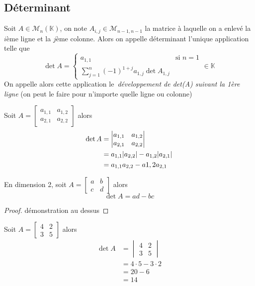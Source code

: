 \documentclass[11pt,colorlinks]{book}
\theoremstyle{mytheoremstyle}
\theoremstyle{mytheoremstyle}
\theoremstyle{mytheoremstyle}
\theoremstyle{mytheoremstyle}
\theoremstyle{mytheoremstyle}
\theoremstyle{mytheoremstyle}
\theoremstyle{mytheoremstyle}
\theoremstyle{mytheoremstyle}
\theoremstyle{myproblemstyle}
\def\mbb#1{\mathbb{#1}}
\def\bK{\mbb{K}}
\begin{document}
\subsection{Déterminant}
\begin{definition}
  Soit $A \in \mathcal{M}_n(\bK)$, on note $A_{i,j} \in \mathcal{M}_{n-1,n-1}$ la matrice à laquelle on a enlevé la $i$ème ligne et la 
  $j$ème colonne. Alors on appelle déterminant l'unique application telle que 
  \begin{equation*}
    \det A = \begin{cases}
      a_{1,1} &\text{si } n=1 \\ 
      \sum_{j=1}^{n} (-1)^{1+j} a_{1,j} \det A_{1,j}
    \end{cases} \in \bK
  \end{equation*}
  On appelle alors cette application le \textit{développement de det(A) suivant la 1ère ligne} (on peut le faire pour n'importe quelle ligne ou colonne)
\end{definition}
\begin{ex}
  Soit $A = \begin{bmatrix}
    a_{1,1} & a_{1,2} \\ 
    a_{2,1} & a_{2,2} 
  \end{bmatrix}$
  alors 
  \begin{align*}
    \det A &= \begin{vmatrix}
      a_{1,1} & a_{1,2} \\ 
      a_{2,1} & a_{2,2} 
    \end{vmatrix} \\ 
    &= a_{1,1} \abs{a_{2,2}} - a_{1,2} \abs{a_{2,1}} \\ 
    &= a_{1,1}a_{2,2} - a{1,2}a_{2,1}
  \end{align*}
\end{ex}
\begin{theorem}
  En dimension 2, soit $A = \begin{bmatrix}
    a & b \\ 
    c & d
  \end{bmatrix}$ 
  alors 
  \begin{equation*}
    \det A = ad - bc 
  \end{equation*}
  \begin{proof}
    démonstration au dessus
  \end{proof}
\end{theorem}
\begin{ex}
  Soit $A = \begin{bmatrix}
    4 & 2 \\ 
    3 & 5
  \end{bmatrix}$
  alors 
  \begin{align*}
    \det A &= \begin{vmatrix}
      4 & 2 \\ 
      3 & 5
    \end{vmatrix} \\ 
    &= 4 \cdot 5 - 3 \cdot 2 \\ 
    &= 20 - 6 \\ 
    &= 14
  \end{align*}
\end{ex}
\end{document}
